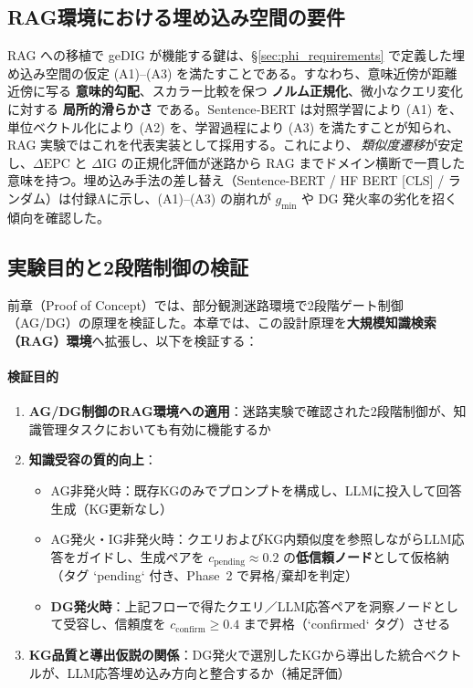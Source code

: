 \documentclass[ja=standard,xelatex]{bxjsarticle}
\begin{document}
\subsection{RAG環境における埋め込み空間の要件}
\label{sec:rag_embed_requirements}
RAG への移植で geDIG が機能する鍵は、\S\ref{sec:phi_requirements} で定義した埋め込み空間の仮定 (A1)--(A3) を満たすことである。すなわち、意味近傍が距離近傍に写る \textbf{意味的勾配}、スカラー比較を保つ \textbf{ノルム正規化}、微小なクエリ変化に対する \textbf{局所的滑らかさ} である。Sentence‑BERT は対照学習により (A1) を、単位ベクトル化により (A2) を、学習過程により (A3) を満たすことが知られ\cite{Reimers2019}、RAG 実験ではこれを代表実装として採用する。これにより、\,\emph{類似度遷移}が安定し、$\Delta\mathrm{EPC}$ と $\Delta\mathrm{IG}$ の正規化評価が迷路から RAG までドメイン横断で一貫した意味を持つ。埋め込み手法の差し替え（Sentence-BERT / HF BERT [CLS] / ランダム）は付録Aに示し、(A1)–(A3) の崩れが $g_{\min}$ や DG 発火率の劣化を招く傾向を確認した。

\subsection{実験目的と2段階制御の検証}

前章（Proof of Concept）では、部分観測迷路環境で2段階ゲート制御（AG/DG）の原理を検証した。本章では、この設計原理を\textbf{大規模知識検索（RAG）環境}へ拡張し、以下を検証する：

\paragraph{検証目的}
\begin{enumerate}
  \item \textbf{AG/DG制御のRAG環境への適用}：迷路実験で確認された2段階制御が、知識管理タスクにおいても有効に機能するか

  \item \textbf{知識受容の質的向上}：
  \begin{itemize}
    \item AG非発火時：既存KGのみでプロンプトを構成し、LLMに投入して回答生成（KG更新なし）
    \item AG発火・IG非発火時：クエリおよびKG内類似度を参照しながらLLM応答をガイドし、生成ペアを $c_{\mathrm{pending}}\approx0.2$ の\textbf{低信頼ノード}として仮格納（タグ `pending` 付き、Phase~2 で昇格/棄却を判定）
    \item \textbf{DG発火時}：上記フローで得たクエリ／LLM応答ペアを洞察ノードとして受容し、信頼度を $c_{\mathrm{confirm}}\ge0.4$ まで昇格（`confirmed` タグ）させる
  \end{itemize}

  \item \textbf{KG品質と導出仮説の関係}：DG発火で選別したKGから導出した統合ベクトルが、LLM応答埋め込み方向と整合するか（補足評価）
\end{enumerate}
\end{document}
